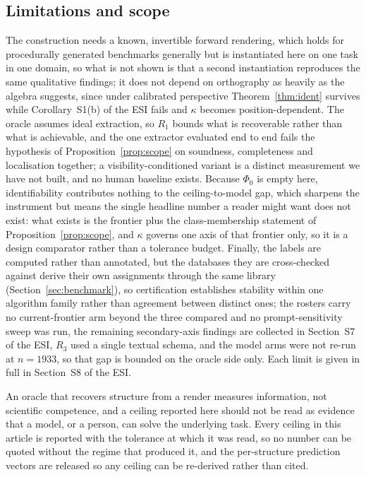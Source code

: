 \subsection{Limitations and scope}
\label{sec:limits}
 The construction needs a known, invertible
forward rendering, which holds for procedurally generated benchmarks generally but is instantiated here on one
task in one domain, so what is not shown is that a second instantiation reproduces the same qualitative
findings; it does not depend on orthography as heavily as the algebra suggests, since under calibrated
perspective Theorem~\ref{thm:ident} survives while Corollary~S1(b) of the ESI\dag{} fails and $\kappa$ becomes
position-dependent. The oracle assumes ideal extraction, so $R_1$ bounds what is recoverable rather than what
is achievable, and the one extractor evaluated end to end fails the hypothesis of
Proposition~\ref{prop:scope} on soundness, completeness and localisation together; a visibility-conditioned
variant is a distinct measurement we have not built, and no human baseline exists. Because $\Phi_0$ is empty
here, identifiability contributes nothing to the ceiling-to-model gap, which sharpens the instrument but means
the single headline number a reader might want does not exist: what exists is the frontier plus the
class-membership statement of Proposition~\ref{prop:scope}, and $\kappa$ governs one axis of that frontier
only, so it is a design comparator rather than a tolerance budget. Finally, the labels are computed rather
than annotated, but the databases they are cross-checked against derive their own assignments through the same
library (Section~\ref{sec:benchmark}), so certification establishes stability within one algorithm family
rather than agreement between distinct ones; the rosters carry no current-frontier arm beyond the three
compared and no prompt-sensitivity sweep was run, the remaining secondary-axis findings are collected in
Section~S7 of the ESI\dag{}, $R_3$ used a single textual schema, and the model arms were not
re-run at $n=1933$, so that gap is bounded on the oracle side only. Each limit is given in full in
Section~S8 of the ESI\dag{}.

An oracle that recovers structure from a render measures information, not scientific competence, and a
ceiling reported here should not be read as evidence that a model, or a person, can solve the underlying
task. Every ceiling in this article is reported with the tolerance at which it was read, so no number can be
quoted without the regime that produced it, and the per-structure prediction vectors are released so any
ceiling can be re-derived rather than cited.

